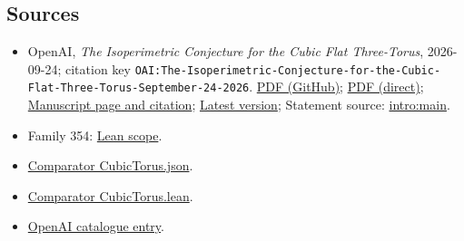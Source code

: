 \documentclass[11pt]{article}
\begin{document}
\subsection{Sources}
\begin{itemize}
\item OpenAI, \emph{The Isoperimetric Conjecture for the Cubic Flat Three-Torus}, 2026-09-24; citation key \texttt{OAI:The-Isoperimetric-Conjecture-for-the-Cubic-Flat-Three-Torus-September-24-2026}. \href{https://github.com/openai/math/blob/adc7f1241b42e322a6451854ab7e4b4c146bf78a/preprints/The-Isoperimetric-Conjecture-for-the-Cubic-Flat-Three-Torus-September-24-2026/article.pdf}{PDF (GitHub)}; \href{https://github.com/openai/math/raw/adc7f1241b42e322a6451854ab7e4b4c146bf78a/preprints/The-Isoperimetric-Conjecture-for-the-Cubic-Flat-Three-Torus-September-24-2026/article.pdf}{PDF (direct)}; \href{https://github.com/openai/math/blob/adc7f1241b42e322a6451854ab7e4b4c146bf78a/preprints/The-Isoperimetric-Conjecture-for-the-Cubic-Flat-Three-Torus-September-24-2026/README.md}{Manuscript page and citation}; \href{https://github.com/openai/math/blob/main/preprints/The-Isoperimetric-Conjecture-for-the-Cubic-Flat-Three-Torus-September-24-2026/article.pdf}{Latest version}; Statement source: \href{https://github.com/openai/math/blob/adc7f1241b42e322a6451854ab7e4b4c146bf78a/preprints/The-Isoperimetric-Conjecture-for-the-Cubic-Flat-Three-Torus-September-24-2026/build/paper.tex\#L56}{intro:main}.
\item Family 354: \href{https://github.com/openai/math/blob/adc7f1241b42e322a6451854ab7e4b4c146bf78a/lean/docs/354.md}{Lean scope}.
\item \href{https://github.com/openai/math/blob/adc7f1241b42e322a6451854ab7e4b4c146bf78a/lean/ComparatorChallenges/CubicTorus.json}{Comparator CubicTorus.json}.
\item \href{https://github.com/openai/math/blob/adc7f1241b42e322a6451854ab7e4b4c146bf78a/lean/ComparatorChallenges/CubicTorus.lean}{Comparator CubicTorus.lean}.
\item \href{https://github.com/openai/math/blob/adc7f1241b42e322a6451854ab7e4b4c146bf78a/CONTENTS.md}{OpenAI catalogue entry}.
\end{itemize}
\end{document}
